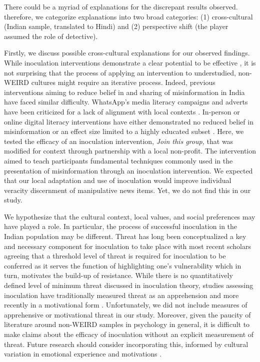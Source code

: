 \documentclass[empirical, authordate, issue]{jote-new-article}
\begin{document}
There could be a myriad of explanations for the discrepant results observed. therefore, we categorize explanations into two broad categories: (1) cross-cultural (Indian sample, translated to Hindi) and (2) perspective shift (the player assumed the role of detective).

Firstly, we discuss possible cross-cultural explanations for our observed findings. While inoculation interventions demonstrate a clear potential to be effective \parencite{Traberg2022}, it is not surprising that the process of applying an intervention to understudied, non-WEIRD cultures \parencite{Henrich2010, Rad2018} might require an iterative process. Indeed, previous interventions aiming to reduce belief in and sharing of misinformation in India have faced similar difficulty. \mbox{WhatsApp}'s media literacy campaigns and adverts have been criticized for a lack of alignment with local contexts \parencite{Medeiros2021}. In-person or online digital literacy interventions have either demonstrated no reduced belief in misinformation \parencite{Badrinathan2021} or an effect size limited to a highly educated subset \parencite{Guess2020}. Here, we tested the efficacy of an inoculation intervention, \emph{Join this group, }that was modified for context through partnership with a local non-profit. The intervention aimed to teach participants fundamental techniques commonly used in the presentation of misinformation through an inoculation intervention. We expected that our local adaptation and use of inoculation would improve individual veracity discernment of manipulative news items. Yet, we do not find this in our study.

We hypothesize that the cultural context, local values, and social preferences may have played a role. In particular, the process of successful inoculation in the Indian population may be different. Threat has long been conceptualized a key and necessary component for inoculation to take place \parencite{McGuire1964} with most recent scholars agreeing that a threshold level of threat is required for inoculation to be conferred \parencite{Compton2021} as it serves the function of highlighting one's vulnerability which in turn, motivates the build-up of resistance. While there is no quantitatively defined level of minimum threat discussed in inoculation theory, studies assessing inoculation have traditionally measured threat as an apprehension \parencite{Ivanov2022, Wood2007} and more recently in a motivational form \parencite{Banas2017}. Unfortunately, we did not include measures of apprehensive or motivational threat in our study. Moreover, given the paucity of literature around non-WEIRD samples in psychology in general, it is difficult to make claims about the efficacy of inoculation without an explicit measurement of threat. Future research should consider incorporating this, informed by cultural variation in emotional experience and motivations \parencite{Kwan2016, Lim2004, Matsumoto2008, Mesquita2003}.
\end{document}

